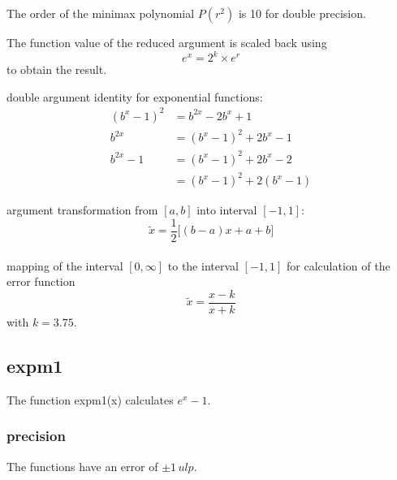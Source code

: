 \documentclass[10pt,a4paper,final,oneside]{article}
\numberwithin{equation}{subsection}
\begin{document}
    The order of the minimax polynomial $P(r^2)$ is 10 for double precision.

 The function value of the reduced argument is scaled back using
    \begin{equation}
        e^x = 2^k \times e^r
    \end{equation}
    to obtain the result.



double argument identity for exponential functions:
\[
    \begin{aligned}
        (b^x-1)^2 &= b^{2x} - 2b^x + 1 \\
        b^{2x}    &= (b^x-1)^2 + 2b^x - 1 \\
        b^{2x} -1 &= (b^x-1)^2 + 2b^x -2 \\
                  &= (b^x-1)^2 + 2(b^x-1)
    \end{aligned}
\]

argument transformation from $ [a, b] $ into interval $ [-1, 1] $:
\[
    \tilde x = \frac{1}{2} \big[(b-a) x + a +b \big]
\]
\\[10pt]
mapping of the interval $ [0, \infty] $ to the interval $ [-1, 1] $ for
calculation of the error function
\[
    \tilde x = \frac{x-k}{x+k}
\]
with $ k = 3.75 $.


\subsection{expm1}
\label{sub_sec:expm1}
The function expm1(x) calculates $ e^x-1 $.

\subsubsection{precision}
The functions have an error of $ \pm 1\, ulp$.
\end{document}
